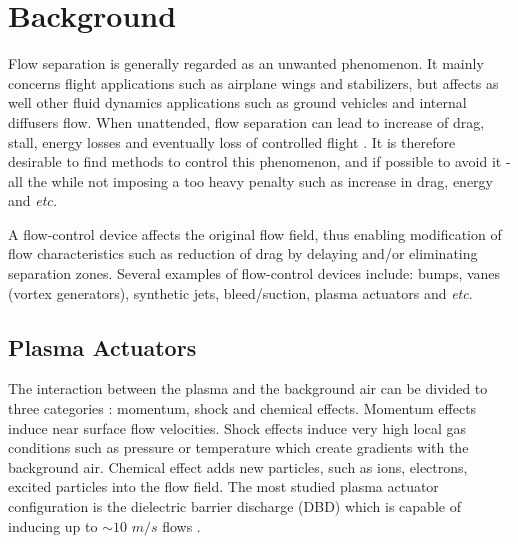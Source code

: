 \documentclass[10pt,a4paper]{article}
\begin{document}


\section{Background}
Flow separation is generally regarded as an unwanted phenomenon. It mainly concerns flight applications such as airplane wings and stabilizers, but affects as well other fluid dynamics applications such as ground vehicles and internal diffusers flow. When unattended, flow separation can lead to increase of drag, stall, energy losses and eventually loss of controlled flight \cite{SIMPSON}. It is therefore desirable to find methods to control this phenomenon, and if possible to avoid it - all the while not imposing a too heavy penalty such as increase in drag, energy and \textit{etc.}  
\par A flow-control device affects the original flow field, thus enabling modification of flow characteristics such as reduction of drag by delaying and/or eliminating separation zones. Several examples of flow-control devices include: bumps, vanes (vortex generators), synthetic jets, bleed/suction, plasma actuators and \textit{etc}.
\subsection{Plasma Actuators}
The interaction between the plasma and the background air can be divided to three categories \cite{FLOWCTRL}: momentum, shock and chemical effects. Momentum effects induce near surface flow velocities. Shock effects induce very high local gas conditions such as pressure or temperature which create gradients with the background air. Chemical effect adds new particles, such as ions, electrons, excited particles into the flow field. The most studied plasma actuator configuration is the dielectric barrier discharge (DBD) which is capable of inducing up to $\sim10$ $m/s$ flows \cite{MOREAU,FLOWCTRL,KOK,WHALLEY}.
\end{document}
